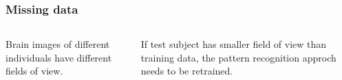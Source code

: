 \begin{frame}
\frametitle{Missing data}
\begin{columns}
Brain images of different individuals have different fields of view.\par
If test subject has smaller field of view than training data, the pattern recognition approch needs to be retrained.\par
{}
\end{columns}
\end{frame}


